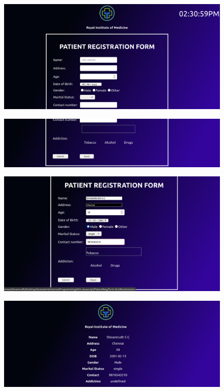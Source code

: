 \documentclass[12pt,letterpaper]{article}
\begin{document}
\newpage
\subsection*{}
\begin{figure}[h]
    \centering
    \includegraphics[width = \textwidth]{PatientReg/Pics/form1.png}
\end{figure}
\begin{figure}[h]
    \centering
    \includegraphics[width = \textwidth]{PatientReg/Pics/form2.png}
\end{figure}
\newpage
\begin{figure}[h!]
    \centering
    \includegraphics[width = \textwidth]{PatientReg/Pics/form3.png}
\end{figure}
\begin{figure}[h!]
    \centering
    \includegraphics[width = \textwidth]{PatientReg/Pics/form4.png}
\end{figure}
\end{document}
